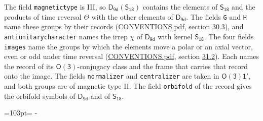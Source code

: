 \documentclass[10pt,a4paper]{article}
\newcommand{\needspace}[1]{\par\penalty-100\begingroup\dimen0=#1\relax\dimen2=\pagegoal
  \advance\dimen2-\pagetotal\ifdim\dimen0>\dimen2\relax\ifdim\dimen2>0pt\vfil\break\fi\fi
  \endgroup}
\numberwithin{equation}{section}
\newcommand{\grp}[1]{\mathsf{#1}}
\begin{document}
The field \texttt{magnetictype} is III, so $\grp{D_{9d}}(\grp{S_{18}})$ contains the elements of $\grp{S_{18}}$ and the products of time reversal $\varTheta$ with the other elements of $\grp{D_{9d}}$. The fields \texttt{G} and \texttt{H} name these groups by their records (\href{../../CONVENTIONS.pdf}{CONVENTIONS.pdf}, section \href{../../CONVENTIONS.pdf\#conv.30.3}{30.3}), and \texttt{antiunitarycharacter} names the irrep $\chi$ of $\grp{D_{9d}}$ with kernel $\grp{S_{18}}$. The four fields \texttt{images} name the groups by which the elements move a polar or an axial vector, even or odd under time reversal (\href{../../CONVENTIONS.pdf}{CONVENTIONS.pdf}, section \href{../../CONVENTIONS.pdf\#conv.31.2}{31.2}). Each names the record of its $\grp{O(3)}$-conjugacy class and the frame that carries that record onto the image. The fields \texttt{normalizer} and \texttt{centralizer} are taken in $\grp{O(3)1'}$, and both groups are of magnetic type II. The field \texttt{orbifold} of the record gives the orbifold symbols of $\grp{D_{9d}}$ and of $\grp{S_{18}}$.
\needspace{103pt}
\end{document}
